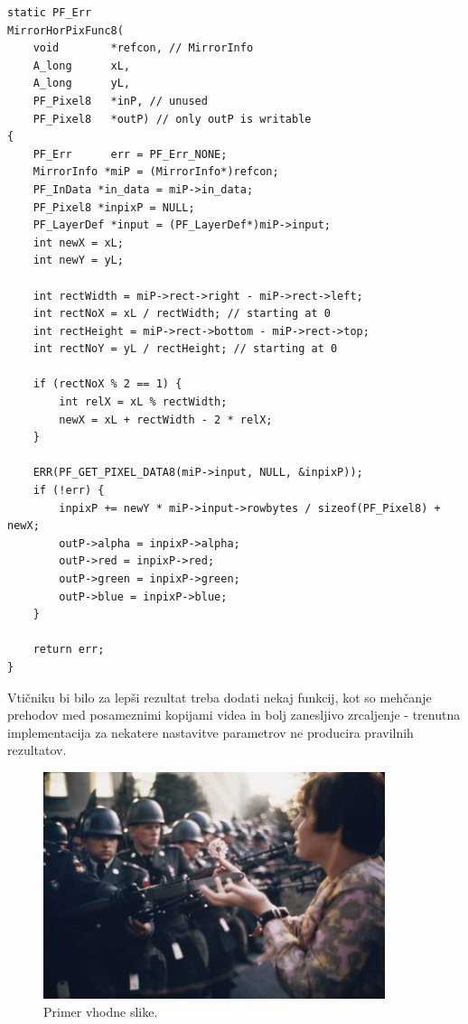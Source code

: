 \documentclass[a4paper, 12pt]{book}
\begin{document}
\begin{verbatim}
static PF_Err
MirrorHorPixFunc8(
    void        *refcon, // MirrorInfo
    A_long      xL, 
    A_long      yL, 
    PF_Pixel8   *inP, // unused
    PF_Pixel8   *outP) // only outP is writable
{
    PF_Err      err = PF_Err_NONE;
    MirrorInfo *miP = (MirrorInfo*)refcon;
    PF_InData *in_data = miP->in_data;
    PF_Pixel8 *inpixP = NULL;
    PF_LayerDef *input = (PF_LayerDef*)miP->input;
    int newX = xL;
    int newY = yL;
    
    int rectWidth = miP->rect->right - miP->rect->left;
    int rectNoX = xL / rectWidth; // starting at 0
    int rectHeight = miP->rect->bottom - miP->rect->top;
    int rectNoY = yL / rectHeight; // starting at 0

    if (rectNoX % 2 == 1) {
        int relX = xL % rectWidth;
        newX = xL + rectWidth - 2 * relX;
    }

    ERR(PF_GET_PIXEL_DATA8(miP->input, NULL, &inpixP));
    if (!err) {
        inpixP += newY * miP->input->rowbytes / sizeof(PF_Pixel8) + newX;
        outP->alpha = inpixP->alpha;
        outP->red = inpixP->red;
        outP->green = inpixP->green;
        outP->blue = inpixP->blue;
    }
    
    return err;
}     
\end{verbatim}

Vtičniku bi bilo za lepši rezultat treba dodati nekaj funkcij, kot so mehčanje prehodov med posameznimi kopijami videa in bolj zanesljivo zrcaljenje 
- trenutna implementacija za nekatere nastavitve parametrov ne producira pravilnih rezultatov. 

\newpage

\begin{figure}[h]
\begin{center}
\includegraphics[width=10cm]{img/naziflower.PNG}
\end{center}
\caption{Primer vhodne slike.}
\label{orig3}
\end{figure}
\end{document}
